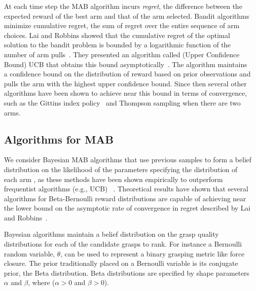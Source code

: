 \documentclass[journal,transmag]{IEEEtran}%
\begin{document}
At each time step the MAB algorithm incurs \textit{regret}, the difference between the expected reward of the best arm and that of the arm selected. Bandit algorithms minimize cumulative regret, the sum of regret over the entire sequence of arm choices.
Lai and Robbins showed that the cumulative regret of the optimal solution to the bandit problem is bounded by a logarithmic function of the number of arm pulls~\cite{lai1985asymptotically}.
They presented an algorithm called (Upper Confidence Bound) UCB that obtains this bound asymptotically~\cite{lai1985asymptotically}.
The algorithm maintains a confidence bound on the distribution of reward based on prior observations and pulls the arm with the highest upper confidence bound.
Since then several other algorithms have been shown to achieve near this bound in terms of convergence, such as the Gittins index policy~\cite{weber1992gittins} and Thompson sampling when there are two arms\cite{agrawal2011analysis}.

\subsection{Algorithms for MAB}\label{sec:bandit_algorithm}
We consider Bayesian MAB algorithms that use previous samples to form a belief distribution on the likelihood of the parameters specifying the distribution of each arm \cite{weber1992gittins,agrawal2011analysis}, as these methods have been shown empirically to outperform frequentist algorithms (e.g., UCB) ~\cite{chapelle2011empirical, bachman2013greedy}. Theoretical results have shown that several algorithms for Beta-Bernoulli reward distributions are capable of achieving near the lower bound on the asymptotic rate of convergence in regret described by Lai and Robbins~\cite{gittins1983dynamic, agrawal2011analysis, kaufmann2012bayesian}.

Bayesian algorithms maintain a belief distribution on the grasp quality distributions for each of the candidate grasps to rank. For instance a Bernoulli random variable, $\theta$, can be used to represent a binary grasping metric like force closure. The prior traditionally placed on a Bernoulli variable is its conjugate prior, the Beta distribution. 
Beta distributions are specified by shape parameters $\alpha$ and $\beta$, where ($\alpha >0$ and $\beta >0$).
\end{document}
